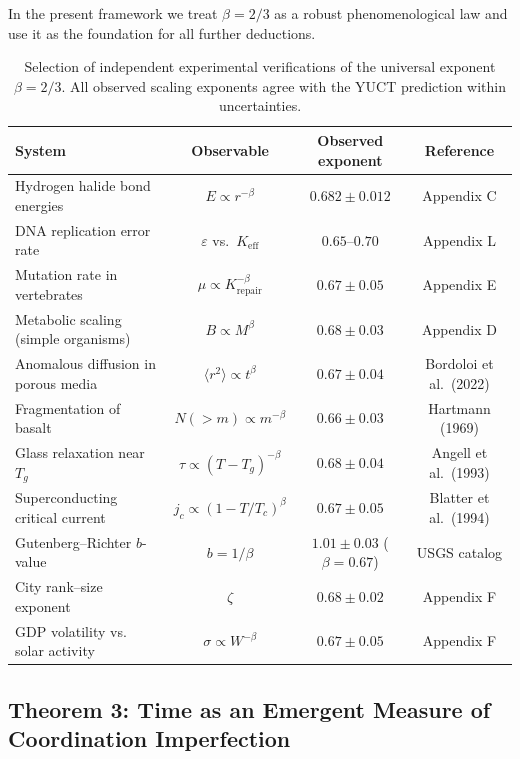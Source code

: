 \documentclass[12pt,a4paper]{article}
\begin{document}
	In the present framework we treat \(\beta = 2/3\) as a robust phenomenological law and use it as the foundation for all further deductions.
	
	\begin{table}[htbp]
		\centering
		\caption{Selection of independent experimental verifications of the universal exponent \(\beta = 2/3\). All observed scaling exponents agree with the YUCT prediction within uncertainties.}
		\label{tab:beta-evidence}
		\small
		\begin{tabular}{l c c c}
			\toprule
			\textbf{System} & \textbf{Observable} & \textbf{Observed exponent} & \textbf{Reference} \\
			\midrule
			Hydrogen halide bond energies & \(E \propto r^{-\beta}\) & \(0.682 \pm 0.012\) & Appendix C \\
			DNA replication error rate & \(\varepsilon\) vs.\ \(K_{\mathrm{eff}}\) & \(0.65\text{--}0.70\) & Appendix L \\
			Mutation rate in vertebrates & \(\mu \propto K_{\mathrm{repair}}^{-\beta}\) & \(0.67 \pm 0.05\) & Appendix E \\
			Metabolic scaling (simple organisms) & \(B \propto M^{\beta}\) & \(0.68 \pm 0.03\) & Appendix D \\
			Anomalous diffusion in porous media & \(\langle r^2 \rangle \propto t^{\beta}\) & \(0.67 \pm 0.04\) & Bordoloi et al.\ (2022) \\
			Fragmentation of basalt & \(N(>m) \propto m^{-\beta}\) & \(0.66 \pm 0.03\) & Hartmann (1969) \\
			Glass relaxation near \(T_g\) & \(\tau \propto (T-T_g)^{-\beta}\) & \(0.68 \pm 0.04\) & Angell et al.\ (1993) \\
			Superconducting critical current & \(j_c \propto (1-T/T_c)^{\beta}\) & \(0.67 \pm 0.05\) & Blatter et al.\ (1994) \\
			Gutenberg–Richter \(b\)-value & \(b = 1/\beta\) & \(1.01 \pm 0.03\) (\(\beta=0.67\)) & USGS catalog \\
			City rank–size exponent & \(\zeta\) & \(0.68 \pm 0.02\) & Appendix F \\
			GDP volatility vs. solar activity & \(\sigma \propto W^{-\beta}\) & \(0.67 \pm 0.05\) & Appendix F \\
			\bottomrule
		\end{tabular}
	\end{table}
	
\subsection{Theorem 3: Time as an Emergent Measure of Coordination Imperfection}
\label{subsec:time-emergence}
\end{document}
